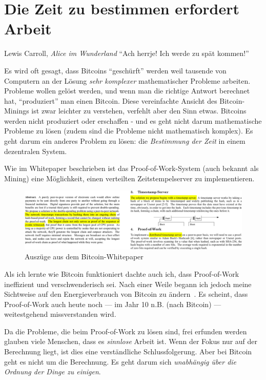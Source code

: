 \chapter{Die Zeit zu bestimmen erfordert Arbeit}
\label{les:17}

\begin{chapquote}{Lewis Carroll, \textit{Alice im Wunderland}}
\enquote{Ach herrje! Ich werde zu spät kommen!}
\end{chapquote}

Es wird oft gesagt, dass Bitcoins \enquote{geschürft} werden weil tausende von
Computern an der Lösung \textit{sehr komplexer} mathematischer Probleme
arbeiten. Probleme wollen gelöst werden, und wenn man die richtige Antwort
berechnet hat, \enquote{produziert} man einen Bitcoin. Diese vereinfachte
Ansicht des Bitcoin-Minings ist zwar leichter zu verstehen, verfehlt aber den
Sinn etwas. Bitcoins werden nicht produziert oder erschaffen - und es geht nicht
darum mathematische Probleme zu lösen (zudem sind die Probleme nicht
mathematisch komplex). Es geht darum ein anderes Problem zu lösen: die
\textit{Bestimmung der Zeit} in einem dezentralen System.

Wie im Whitepaper beschrieben ist das Proof-of-Work-System (auch bekannt als
Mining) eine Möglichkeit, einen verteilten Zeitstempelserver zu implementieren.

\begin{figure}
  \includegraphics[width=\textwidth]{assets/images/bitcoin-whitepaper-timestamp-wide.png}
  \caption{Auszüge aus dem Bitcoin-Whitepaper}
  \label{fig:bitcoin-whitepaper-timestamp-wide}
\end{figure}

Als ich lernte wie Bitcoin funktioniert dachte auch ich, dass Proof-of-Work
ineffizient und verschwenderisch sei. Nach einer Weile begann ich jedoch meine
Sichtweise auf den Energieverbrauch von Bitcoin zu ändern~\cite{gigi:energy}. Es
scheint, dass Proof-of-Work auch heute noch --- im Jahr 10 n.B. (nach Bitcoin)
--- weitestgehend missverstanden wird.

Da die Probleme, die beim Proof-of-Work zu lösen sind, frei erfunden werden
glauben viele Menschen, dass es \textit{sinnlose} Arbeit ist. Wenn der Fokus nur
auf der Berechnung liegt, ist dies eine verständliche Schlussfolgerung. Aber bei
Bitcoin geht es nicht um die Berechnung. Es geht darum sich \textit{unabhängig
über die Ordnung der Dinge zu einigen}.

